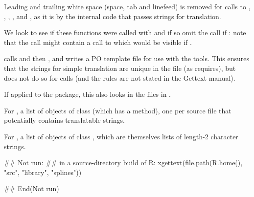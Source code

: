 \begin{Details}\relax
Leading and trailing white space (space, tab and linefeed) is removed
for calls to , , ,
, and , as it is by the internal code that
passes strings for translation.

We look to see if these functions were called with 
and if so omit the call if : note that the
call might contain a call to  which would be visible if
.

 calls  and then ,
and writes a PO template file for use with the 
tools.  This ensures that the strings for simple translation are
unique in the file (as  requires), but does not do so
for  calls (and the rules are not stated in the Gettext
manual).

If applied to the  package, this also looks in the 
files in .
\end{Details}
%
\begin{Value}
For , a list of objects of class 
(which has a  method), one per source file that
potentially contains translatable strings.

For , a list of objects of class ,
which are themselves lists of length-2 character strings.
\end{Value}
%
\begin{Examples}
\begin{ExampleCode}
## Not run: ## in a source-directory build of R:
xgettext(file.path(R.home(), "src", "library", "splines"))

## End(Not run)
\end{ExampleCode}
\end{Examples}
\clearpage
